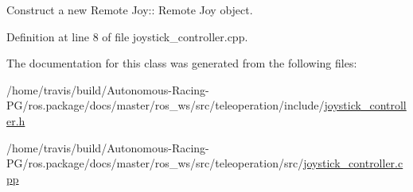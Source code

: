 Construct a new Remote Joy\+:\+: Remote Joy object. 



Definition at line 8 of file joystick\+\_\+controller.\+cpp.



The documentation for this class was generated from the following files\+:\begin{DoxyCompactItemize}
\item 
/home/travis/build/\+Autonomous-\/\+Racing-\/\+P\+G/ros.\+package/docs/master/ros\+\_\+ws/src/teleoperation/include/\hyperlink{joystick__controller_8h}{joystick\+\_\+controller.\+h}\item 
/home/travis/build/\+Autonomous-\/\+Racing-\/\+P\+G/ros.\+package/docs/master/ros\+\_\+ws/src/teleoperation/src/\hyperlink{joystick__controller_8cpp}{joystick\+\_\+controller.\+cpp}\end{DoxyCompactItemize}
